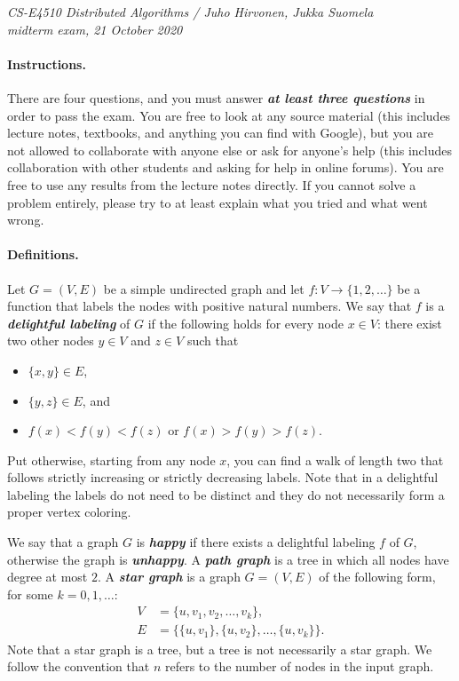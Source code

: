 \documentclass[12pt,a4paper]{article}
\newcommand{\hl}[1]{\textbf{\emph{#1}}}
\begin{document}
\noindent
\emph{CS-E4510 Distributed Algorithms / Juho Hirvonen, Jukka Suomela\\
midterm exam, 21 October 2020}

\paragraph{Instructions.}

There are four questions, and you must answer \hl{at least three questions} in order to pass the exam. You are free to look at any source material (this includes lecture notes, textbooks, and anything you can find with Google), but you are not allowed to collaborate with anyone else or ask for anyone's help (this includes collaboration with other students and asking for help in online forums). You are free to use any results from the lecture notes directly. If you cannot solve a problem entirely, please try to at least explain what you tried and what went wrong.

\paragraph{Definitions.}

Let $G = (V,E)$ be a simple undirected graph and let $f\colon V \to \{1,2,\dotsc\}$ be a function that labels the nodes with positive natural numbers. We say that $f$ is a \hl{delightful labeling} of $G$ if the following holds for every node $x \in V$: there exist two other nodes $y \in V$ and $z \in V$ such that
\begin{itemize}[noitemsep]
    \item $\{x,y\} \in E$,
    \item $\{y,z\} \in E$, and
    \item $f(x) < f(y) < f(z)$ or $f(x) > f(y) > f(z)$.
\end{itemize}
Put otherwise, starting from any node $x$, you can find a walk of length two that follows strictly increasing or strictly decreasing labels. Note that in a delightful labeling the labels do not need to be distinct and they do not necessarily form a proper vertex coloring.

We say that a graph $G$ is \hl{happy} if there exists a delightful labeling $f$ of $G$, otherwise the graph is \hl{unhappy}. A \hl{path graph} is a tree in which all nodes have degree at most $2$. A \hl{star graph} is a graph $G = (V,E)$ of the following form, for some $k = 0, 1, \dotsc$:
\begin{align*}
    V &= \bigl\{ u, v_1, v_2, \dotsc, v_k \bigr\}, \\
    E &= \bigl\{ \{u, v_1\}, \{u, v_2\}, \dotsc, \{u, v_k\} \bigr\}.
\end{align*}
Note that a star graph is a tree, but a tree is not necessarily a star graph. We follow the convention that $n$ refers to the number of nodes in the input graph.
\end{document}
